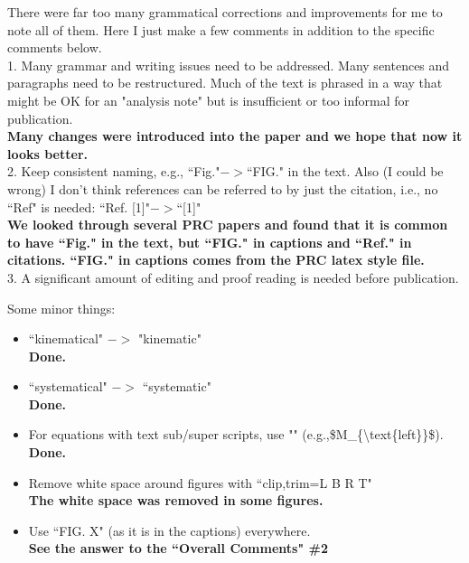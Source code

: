 \documentclass[,superscriptaddress,showpacs,amssymb,amsmath,amsfonts,linenumbers,article]{revtex4-1}
\begin{document}
There were far too many grammatical corrections and improvements for me to note all of them. Here I just make a few comments in addition to the specific comments below.\\[0.5cm]

1. Many grammar and writing issues need to be addressed. Many sentences and paragraphs need to be restructured. Much of the text is phrased in a way that might be OK for an "analysis note" but is insufficient or too informal for publication.\\
{\bf Many changes were introduced into the paper and we hope that now it looks better.}\\[0.5cm]

2. Keep consistent naming, e.g., ``Fig."$->$``FIG." in the text. Also (I could be wrong) I don't think references can be referred to by just the citation, i.e., no ``Ref" is needed: ``Ref. [1]"$->$``[1]"\\
{\bf We looked through several PRC papers and found that it is common to have ``Fig." in the text, but ``FIG." in captions and ``Ref." in citations. ``FIG." in captions comes from the PRC latex style file.}\\[0.5cm]


3. A significant amount of editing and proof reading is needed before publication.\\
\vspace{0.5cm}

Some minor things:\\
\vspace{-0.3cm}

\begin{itemize}

\item ``kinematical" $->$ "kinematic"\\[0.5cm]
{\bf Done.}

\item ``systematical" $->$ ``systematic"\\[0.5cm]
{\bf Done.}

\item For equations with text sub/super scripts, use "\text" (e.g.,\$M\_\{\textbackslash text\{left\}\}\$).\\[0.5cm]
{\bf Done.}

\item Remove white space around figures with ``clip,trim=L B R T"\\[0.5cm]
{\bf The white space was removed in some figures.}

\item Use ``FIG. X" (as it is in the captions) everywhere.\\[0.5cm]
{\bf See the answer to the ``Overall Comments" \#2}

\end{itemize}
\end{document}
